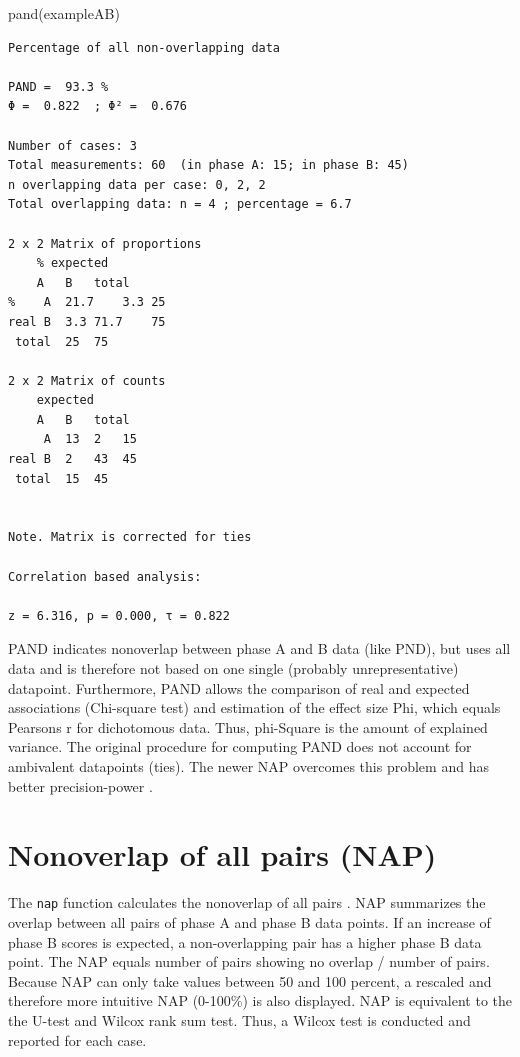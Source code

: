 \documentclass[
]{book}
\newenvironment{Shaded}{\begin{snugshade}}{\end{snugshade}}
\newcommand{\FunctionTok}[1]{\textcolor[rgb]{0.00,0.00,0.00}{#1}}
\newcommand{\NormalTok}[1]{#1}
\begin{document}
\begin{Shaded}
\begin{Highlighting}[]
\FunctionTok{pand}\NormalTok{(exampleAB)}
\end{Highlighting}
\end{Shaded}

\begin{verbatim}
Percentage of all non-overlapping data

PAND =  93.3 %
Φ =  0.822  ; Φ² =  0.676 

Number of cases: 3 
Total measurements: 60  (in phase A: 15; in phase B: 45)
n overlapping data per case: 0, 2, 2
Total overlapping data: n = 4 ; percentage = 6.7 

2 x 2 Matrix of proportions
    % expected
    A   B   total
%    A  21.7    3.3 25
real B  3.3 71.7    75
 total  25  75

2 x 2 Matrix of counts
    expected
    A   B   total
     A  13  2   15
real B  2   43  45
 total  15  45


Note. Matrix is corrected for ties

Correlation based analysis:

z = 6.316, p = 0.000, τ = 0.822 
\end{verbatim}

PAND indicates nonoverlap between phase A and B data (like PND), but uses all data and is therefore not based on one single (probably unrepresentative) datapoint. Furthermore, PAND allows the comparison of real and expected associations (Chi-square test) and estimation of the effect size Phi, which equals Pearsons r for dichotomous data. Thus, phi-Square is the amount of explained variance. The original procedure for computing PAND does not account for ambivalent datapoints (ties). The newer NAP overcomes this problem and has better precision-power \citep{parker_effect_2011}.

\hypertarget{nonoverlap-of-all-pairs-nap}{%
\section{Nonoverlap of all pairs (NAP)}\label{nonoverlap-of-all-pairs-nap}}

The \texttt{nap} function calculates the nonoverlap of all pairs \citep{parker_improved_2009}. NAP summarizes the overlap between all pairs of phase A and phase B data points. If an increase of phase B scores is expected, a non-overlapping pair has a higher phase B data point. The NAP equals number of pairs showing no overlap / number of pairs. Because NAP can only take values between 50 and 100 percent, a rescaled and therefore more intuitive NAP (0-100\%) is also displayed. NAP is equivalent to the the U-test and Wilcox rank sum test. Thus, a Wilcox test is conducted and reported for each case.
\end{document}
